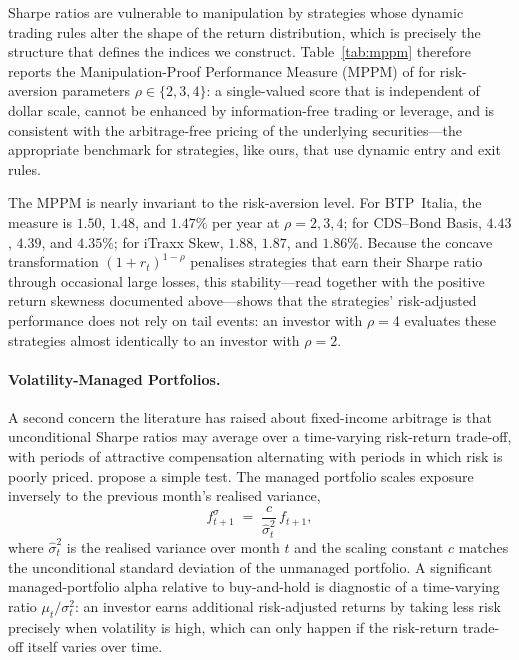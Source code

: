 Sharpe ratios are vulnerable to manipulation by strategies whose
dynamic trading rules alter the shape of the return distribution,
which is precisely the structure that defines the indices we
construct. Table~\ref{tab:mppm} therefore reports the
Manipulation-Proof Performance Measure (MPPM) of
\citet{goetzmann2007portfolio} for risk-aversion parameters
$\rho \in \{2, 3, 4\}$: a single-valued score that is independent of
dollar scale, cannot be enhanced by information-free trading or leverage, and is consistent with the arbitrage-free
pricing of the underlying securities---the appropriate benchmark for strategies, like ours,
that use dynamic entry and exit rules.

The MPPM is nearly invariant to the risk-aversion level. For
BTP~Italia, the measure is $1.50$, $1.48$, and $1.47\%$ per year at
$\rho = 2, 3, 4$; for CDS--Bond Basis, $4.43$, $4.39$, and $4.35\%$; for
iTraxx Skew, $1.88$, $1.87$, and $1.86\%$. Because the concave
transformation $(1+r_t)^{1-\rho}$ penalises strategies that earn their
Sharpe ratio through occasional large losses, this stability---read
together with the positive return skewness documented above---shows
that the strategies' risk-adjusted performance does not rely on tail
events: an investor with $\rho = 4$ evaluates these strategies almost
identically to an investor with $\rho = 2$.

\paragraph{Volatility-Managed Portfolios.}

A second concern the literature has raised about fixed-income
arbitrage is that unconditional Sharpe ratios may average over a
time-varying risk-return trade-off, with periods of attractive
compensation alternating with periods in which risk is poorly priced.
\citet{moreira2017volatility} propose a simple test. The managed
portfolio scales exposure inversely to the previous month's realised
variance,
\begin{equation}
f^{\sigma}_{t+1} \;=\; \frac{c}{\hat{\sigma}^{2}_{t}}\, f_{t+1},
\label{eq:moreira_muir}
\end{equation}
where $\hat{\sigma}^{2}_{t}$ is the realised variance over month $t$
and the scaling constant $c$ matches the unconditional standard
deviation of the unmanaged portfolio. A significant managed-portfolio
alpha relative to buy-and-hold is diagnostic of a time-varying ratio
$\mu_t / \sigma^{2}_{t}$: an investor earns additional risk-adjusted
returns by taking less risk precisely when volatility is high, which
can only happen if the risk-return trade-off itself varies over time.

